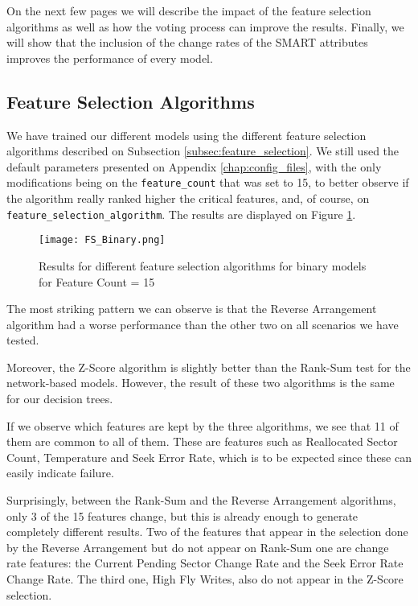 On the next few pages we will describe the impact of the feature selection algorithms as well as how the voting process can improve the results.
Finally, we will show that the inclusion of the change rates of the SMART attributes improves the performance of every model.

\subsection{Feature Selection Algorithms}

We have trained our different models using the different feature selection algorithms described on Subsection \ref{subsec:feature_selection}.
We still used the default parameters presented on Appendix \ref{chap:config_files}, with the only modifications being on the \verb|feature_count| that was set to 15, to better observe if the algorithm really ranked higher the critical features,  and, of course, on \verb|feature_selection_algorithm|.
The results are displayed on Figure \ref{fig:fs_binary}.

\begin{figure}
\begin{center}
  \texttt{[image: FS\_Binary.png]}
  \caption[Feature Selection Results]{Results for different feature selection algorithms for binary models for Feature Count = 15}
  \label{fig:fs_binary}
\end{center}
\end{figure}

The most striking pattern we can observe is that the Reverse Arrangement algorithm had a worse performance than the other two on all scenarios we have tested.

Moreover, the Z-Score algorithm is slightly better than the Rank-Sum test for the network-based models.
However, the result of these two algorithms is the same for our decision trees.

If we observe which features are kept by the three algorithms, we see that 11 of them are common to all of them.
These are features such as Reallocated Sector Count, Temperature and Seek Error Rate, which is to be expected since these can easily indicate failure.

Surprisingly, between the Rank-Sum and the Reverse Arrangement algorithms, only 3 of the 15 features change, but this is already enough to generate completely different results.
Two of the features that appear in the selection done by the Reverse Arrangement but do not appear on Rank-Sum one are change rate features: the Current Pending Sector Change Rate and the Seek Error Rate Change Rate.
The third one, High Fly Writes, also do not appear in the Z-Score selection.

